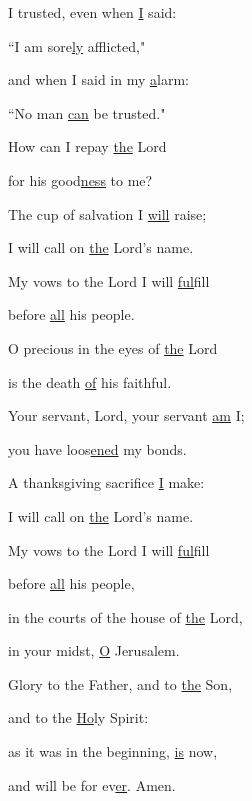 \noindent I trusted, even when \uline{I} said:~\GreStar{}~\nopagebreak

``I am sore\uline{ly} afflicted,"

\noindent and when I said in my \uline{a}larm:~\GreStar{}~\nopagebreak

``No man \uline{can} be trusted."

\noindent How can I repay \uline{the} Lord~\GreStar{}~\nopagebreak

for his good\uline{ness} to me?

\noindent The cup of salvation I \uline{will} raise;~\GreStar{}~\nopagebreak

I will call on \uline{the} Lord’s name.

\noindent My vows to the Lord I will \uline{ful}fill~\GreStar{}~\nopagebreak

before \uline{all} his people.

\noindent O precious in the eyes of \uline{the} Lord~\GreStar{}~\nopagebreak

is the death \uline{of} his faithful.

\noindent Your servant, Lord, your servant \uline{am} I;~\GreStar{}~\nopagebreak

you have loos\uline{ened} my bonds.

\noindent A thanksgiving sacrifice \uline{I} make:~\GreStar{}~\nopagebreak

I will call on \uline{the} Lord’s name.

\noindent My vows to the Lord I will \uline{ful}fill~\GreStar{}~\nopagebreak

before \uline{all} his people,

\noindent in the courts of the house of \uline{the} Lord,~\GreStar{}~\nopagebreak

in your midst, \uline{O} Jerusalem.

\noindent Glory to the Father, and to \uline{the} Son,~\GreStar{}~\nopagebreak

and to the \uline{Ho}ly Spirit:

\noindent as it was in the beginning, \uline{is} now,~\GreStar{}~\nopagebreak

and will be for ev\uline{er}. Amen.

